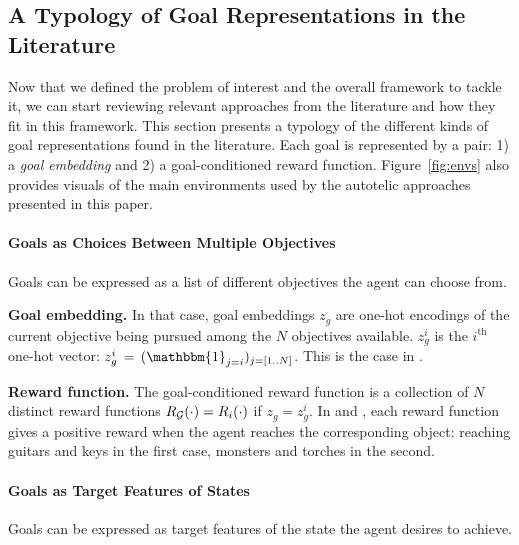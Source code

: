

\subsection{A Typology of Goal Representations in the Literature}
\label{sec:survey_goal_rep}

Now that we defined the problem of interest and the overall framework to tackle it, we can start reviewing relevant approaches from the literature and how they fit in this framework. This section presents a typology of the different kinds of goal representations found in the literature. Each goal is represented by a pair: 1) a \textit{goal embedding} and 2) a goal-conditioned reward function. Figure~\ref{fig:envs} also provides visuals of the main environments used by the autotelic approaches presented in this paper.

\paragraph{Goals as Choices Between Multiple Objectives}
Goals can be expressed as a list of different objectives the agent can choose from.

\textbf{Goal embedding.} In that case, goal embeddings $z_g$ are one-hot encodings of the current objective being pursued among the $N$ objectives available. $z_g^i$ is the $i^\text{th}$ one-hot vector: $z_g^i\,=\,(\mathbbm{1}_{j=i})_{j=[1..N]}$. This is the case in \cite{oh2017zero,mankowitz2018unicorn,codevilla2018end}.

\textbf{Reward function.} The goal-conditioned reward function is a collection of $N$ distinct reward functions $R_{\mathcal{G}}(\cdot)=R_i(\cdot)$ if $z_g=z_g^i$. In \cite{mankowitz2018unicorn} and \cite{chan2019actrce}, each reward function gives a positive reward when the agent reaches the corresponding object: reaching guitars and keys in the first case, monsters and torches in the second.

\paragraph{Goals as Target Features of States}
Goals can be expressed as target features of the state the agent desires to achieve.

